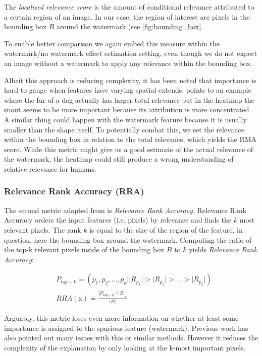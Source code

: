 The \textit{localized relevance score} is the amount of conditional relevance attributed to a certain region of an image. In our case, the region of interest are pixels in the bounding box $B$ around the watermark (see \cref{fig:bounding_box}. 

To enable better comparison we again embed this measure within the watermark/no watermark effect estimation setting, even though we do not expect an image without a watermark to apply any relevance within the bounding box.

Albeit this approach is reducing complexity, it has been noted that importance is hard to gauge when features have varying spatial extends. \cite{Achtibat2022} points to an example where the fur of a dog actually has larger total relevance but in the heatmap the snout seems to be more important because its attribution is more concentrated. A similar thing could happen with the watermark feature because it is usually smaller than the shape itself. 
To potentially combat this, we set the relevance within the bounding box in relation to the total relevance, which yields the RMA score.
While this metric might give us a good estimate of the actual relevance of the watermark, the heatmap could still produce a wrong understanding of relative relevance for humans. \\

\subsubsection{Relevance Rank Accuracy (RRA)}
The second metric adapted from \cite{Arras2022} is \textit{Relevance Rank Accuracy}.  
Relevance Rank Accuracy orders the input features (i.e. pixels) by relevance and finds the $k$ most relevant pixels. The rank $k$ is equal to the size of the region of the feature, in question, here the bounding box around the watermark. Computing the ratio of the top-k relevant pixels inside of the bounding box $B$ to $k$ yields \textit{Relevance Rank Accuracy}:

\begin{align*}
& P_{top-k} = (p_1, p_2,...,p_k | |R_{p_1}| > |R_{p_2}| > ... > |R_{p_k}| ) \\
& RRA(\mathrm{x}) = \frac{|P_{top-k} \cap B|_\mathrm{x}}{|B|} 
\end{align*}

Arguably, this metric loses even more information on whether at least some importance is assigned to the spurious feature (watermark). Previous work has also pointed out many issues with this or similar methods. However it reduces the complexity of the explanation by only looking at the k-most important pixels. \\

